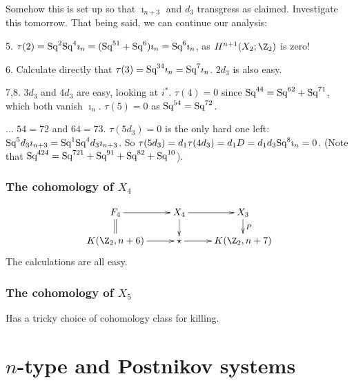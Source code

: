 \documentclass[11pt]{article}
\begin{document}
Somehow this is set up so that $\imath_{n+3}$ and $d_3$ transgress as claimed.
Investigate this tomorrow. That being said, we can continue our analysis:
\begin{itemise}
\item[5.]$\tau(2)=\textup{Sq}^2\textup{Sq}^4\imath_n=(\textup{Sq}^{51}+\textup{Sq}^6)\imath_n=\textup{Sq}^6\imath_n$,
as $H^{n+1}(X_2;\Z_2)$ is zero!
\item[6.] %
Calculate directly that $\tau(3)=\textup{Sq}^{34}\imath_n=\textup{Sq}^7\imath_n$.
$2d_3$ is also easy.
\item[7,8.] $3d_3$ and $4d_3$ are easy, looking at $i^*$. $\tau(4)=0$ since $\textup{Sq}^{44}=\textup{Sq}^{62}+\textup{Sq}^{71}$, which both vanish 
$\imath_n$. $\tau(5)=0$ as $\textup{Sq}^{54}=\textup{Sq}^{72}$.
\item[...] $54=72$ and $64=73$. $\tau(5d_3)=0$ is the only hard one left:
$\textup{Sq}^5d_3\imath_{n+3}=\textup{Sq}^1\textup{Sq}^4d_3\imath_{n+3}$. So $\tau(5d_3)=d_1\tau(4d_3)
=d_1D=d_1d_3\textup{Sq}^8\imath_n=0$. (Note that $\textup{Sq}^{4 2 4} = \textup{Sq}^{7 2 1}
 + \textup{Sq}^{9 1} + \textup{Sq}^{8 2} + \textup{Sq}^{10}$).
\end{itemise}
\subsubsection{\texorpdfstring{The cohomology of $X_4$}{The cohomology of X4}}
\[\xymatrix@R=5mm{
F_4\ar[r]\ar@{=}[d]&
X_4\ar[d]\ar[r]&
X_{3}\ar[d]^{P}\\
K(\Z_2,n+6)\ar[r]&\star\ar[r]&K(\Z_2,n+7)
}\]
The calculations are all easy.
\subsubsection{\texorpdfstring{The cohomology of $X_5$}{The cohomology of X5}}
Has a tricky choice of cohomology class for killing.

\section{\texorpdfstring{$n$}{n}-type and Postnikov systems}
\setcounter{subsection}{1}
\end{document}
